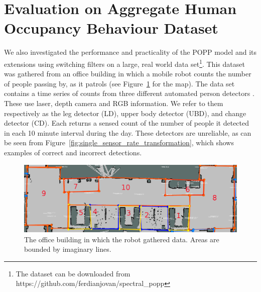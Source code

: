 
\section{Evaluation on Aggregate Human Occupancy Behaviour Dataset}
\label{sec:evareal}

We also investigated the performance and practicality of the POPP model and its extensions using switching filters on a large, real world data set\footnote{The dataset can be downloaded from https://github.com/ferdianjovan/spectral\_popp}.
% 
This dataset was gathered from an office building in which a mobile robot counts the number of people passing by, as it patrols (see Figure~\ref{fig:map_popp_independent_test} for the map). The data set contains a time series of counts from three different automated person detectors \cite{dondrup2015real}. These use laser, depth camera and RGB information. We refer to them respectively as the leg detector (LD), upper body detector (UBD), and change detector (CD). Each returns a sensed count of the number of people it detected in each 10 minute interval during the day. These detectors are unreliable, as can be seen from Figure~\ref{fig:single_sensor_rate_transformation}, which shows examples of correct and incorrect detections.

\begin{figure}[t]
	\centering
	\includegraphics[width=0.95\columnwidth]{./figures/map_popp.png}
	\caption{The office building in which the robot gathered data. Areas are bounded by imaginary lines.}
	\label{fig:map_popp_independent_test}
\end{figure}

